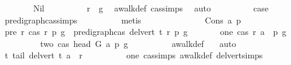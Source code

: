 \begin{isabellebody}
\ \ \ \ \ \ \isamarkupfalse%
\ Nil\isanewline
\ \ \ \ \ \ \isamarkupfalse%
\ \isamarkupfalse%
\ {\isachardoublequoteopen}r\ {\isacharequal}{\kern0pt}\ g{\isachardoublequoteclose}\ \isamarkupfalse%
\ awalk{\isacharunderscore}{\kern0pt}def\ cas{\isachardot}{\kern0pt}simps\ \isamarkupfalse%
\ auto\isanewline
\ \ \ \ \ \ \isamarkupfalse%
\ \isamarkupfalse%
\ {\isacharquery}{\kern0pt}case\ \isamarkupfalse%
\ pre{\isacharunderscore}{\kern0pt}digraph{\isachardot}{\kern0pt}cas{\isachardot}{\kern0pt}simps{\isacharparenleft}{\kern0pt}{}{\isacharparenright}{\kern0pt}\isanewline
\ \ \ \ \ \ \ \ \isamarkupfalse%
\ {\isacharparenleft}{\kern0pt}metis{\isacharparenright}{\kern0pt}\ \ \isanewline
\ \ \ \ \isamarkupfalse%
\isanewline
\ \ \ \ \ \ \isamarkupfalse%
\ {\isacharparenleft}{\kern0pt}Cons\ a\ p{\isacharparenright}{\kern0pt}\isanewline
\ \ \ \ \ \ \isamarkupfalse%
\ pre{\isacharcolon}{\kern0pt}\ {\isachardoublequoteopen}{\isasymAnd}r{\isachardot}{\kern0pt}\ {\isacharparenleft}{\kern0pt}cas\ r\ p\ g\ {\isasymLongrightarrow}\ pre{\isacharunderscore}{\kern0pt}digraph{\isachardot}{\kern0pt}cas\ {\isacharparenleft}{\kern0pt}del{\isacharunderscore}{\kern0pt}vert\ t{\isacharparenright}{\kern0pt}\ r\ p\ g{\isacharparenright}{\kern0pt}{\isachardoublequoteclose}\isanewline
\ \ \ \ \ \ \ one{\isacharcolon}{\kern0pt}\ {\isachardoublequoteopen}cas\ r\ {\isacharparenleft}{\kern0pt}a\ {\isacharhash}{\kern0pt}\ p{\isacharparenright}{\kern0pt}\ g{\isachardoublequoteclose}\isanewline
\ \ \ \ \ \ \isamarkupfalse%
\ \isamarkupfalse%
\ two{\isacharcolon}{\kern0pt}\ {\isachardoublequoteopen}cas\ {\isacharparenleft}{\kern0pt}head\ G\ a{\isacharparenright}{\kern0pt}\ p\ g{\isachardoublequoteclose}\isanewline
\ \ \ \ \ \ \ \ \isamarkupfalse%
\ awalk{\isacharunderscore}{\kern0pt}def\ \ \isamarkupfalse%
\ auto\isanewline
\ \ \ \ \ \ \isamarkupfalse%
\ \isamarkupfalse%
\ t{\isacharcolon}{\kern0pt}\ {\isachardoublequoteopen}tail\ {\isacharparenleft}{\kern0pt}del{\isacharunderscore}{\kern0pt}vert\ t{\isacharparenright}{\kern0pt}\ a\ {\isacharequal}{\kern0pt}\ r{\isachardoublequoteclose}\isanewline
\ \ \ \ \ \ \ \ \isamarkupfalse%
\ one\ cas{\isachardot}{\kern0pt}simps\ awalk{\isacharunderscore}{\kern0pt}def\ del{\isacharunderscore}{\kern0pt}vert{\isacharunderscore}{\kern0pt}simps{\isacharparenleft}{\kern0pt}{}{\isacharparenright}{\kern0pt}\ \isamarkupfalse%

\end{isabellebody}
